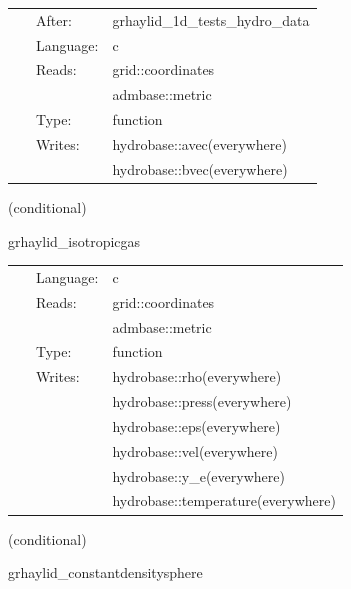 \documentclass{article}
\begin{document}
\hspace{5mm}{\it set initial magnetic data for 1d test } 


\hspace{5mm}

 \begin{tabular*}{160mm}{cll} 
~ & After:  & grhaylid\_1d\_tests\_hydro\_data \\ 
~ & Language:  & c \\ 
~ & Reads:  & grid::coordinates \\ 
~& ~ &admbase::metric\\ 
~ & Type:  & function \\ 
~ & Writes:  & hydrobase::avec(everywhere) \\ 
~& ~ &hydrobase::bvec(everywhere)\\ 
\end{tabular*} 


\vspace{5mm}

   (conditional) 

\hspace{5mm} grhaylid\_isotropicgas 

\hspace{5mm}{\it set three-dimensional isotropic gas initial data } 


\hspace{5mm}

 \begin{tabular*}{160mm}{cll} 
~ & Language:  & c \\ 
~ & Reads:  & grid::coordinates \\ 
~& ~ &admbase::metric\\ 
~ & Type:  & function \\ 
~ & Writes:  & hydrobase::rho(everywhere) \\ 
~& ~ &hydrobase::press(everywhere)\\ 
~& ~ &hydrobase::eps(everywhere)\\ 
~& ~ &hydrobase::vel(everywhere)\\ 
~& ~ &hydrobase::y\_e(everywhere)\\ 
~& ~ &hydrobase::temperature(everywhere)\\ 
\end{tabular*} 


\vspace{5mm}

   (conditional) 

\hspace{5mm} grhaylid\_constantdensitysphere 
\end{document}

